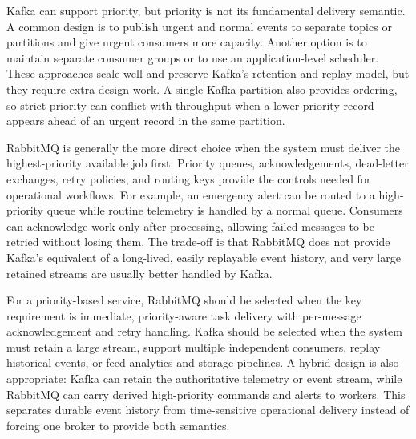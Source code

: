 \documentclass{article}
\begin{document}
Kafka can support priority, but priority is not its fundamental delivery
semantic.  A common design is to publish urgent and normal events to separate
topics or partitions and give urgent consumers more capacity.  Another option
is to maintain separate consumer groups or to use an application-level
scheduler.  These approaches scale well and preserve Kafka's retention and
replay model, but they require extra design work.  A single Kafka partition
also provides ordering, so strict priority can conflict with throughput when a
lower-priority record appears ahead of an urgent record in the same partition.

RabbitMQ is generally the more direct choice when the system must deliver the
highest-priority available job first.  Priority queues, acknowledgements,
dead-letter exchanges, retry policies, and routing keys provide the controls
needed for operational workflows.  For example, an emergency alert can be
routed to a high-priority queue while routine telemetry is handled by a normal
queue.  Consumers can acknowledge work only after processing, allowing failed
messages to be retried without losing them.  The trade-off is that RabbitMQ
does not provide Kafka's equivalent of a long-lived, easily replayable event
history, and very large retained streams are usually better handled by Kafka.

For a priority-based service, RabbitMQ should be selected when the key
requirement is immediate, priority-aware task delivery with per-message
acknowledgement and retry handling.  Kafka should be selected when the system
must retain a large stream, support multiple independent consumers, replay
historical events, or feed analytics and storage pipelines.  A hybrid design
is also appropriate: Kafka can retain the authoritative telemetry or event
stream, while RabbitMQ can carry derived high-priority commands and alerts to
workers.  This separates durable event history from time-sensitive operational
delivery instead of forcing one broker to provide both semantics.
\end{document}
